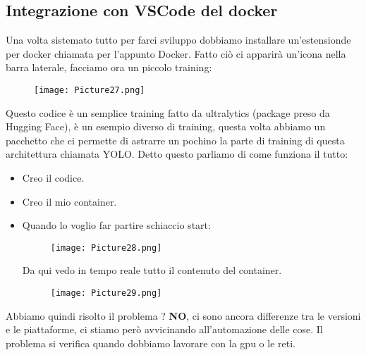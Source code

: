 \documentclass[a4paper,12pt]{article}
\begin{document}
\subsection{Integrazione con VSCode del docker}
Una volta sistemato tutto per farci sviluppo dobbiamo installare un'estensionde per docker chiamata per l'appunto Docker.
Fatto ciò ci apparirà un'icona nella barra laterale, facciamo ora un piccolo training:
\begin{figure}[H]
    \centering
    \texttt{[image: Picture27.png]}
\end{figure}
Questo codice è un semplice training fatto da ultralytics (package preso da Hugging Face), è un esempio diverso di training, questa volta abbiamo un pacchetto che ci permette di astrarre un pochino la parte di training di questa architettura chiamata YOLO.
Detto questo parliamo di come funziona il tutto:
\begin{itemize}
    \item Creo il codice.
    \item Creo il mio container.
    \item Quando lo voglio far partire schiaccio start:
    \begin{figure}[H]
        \centering
        \texttt{[image: Picture28.png]}
    \end{figure}
    Da qui vedo in tempo reale tutto il contenuto del container.
    \begin{figure}[H]
        \centering
        \texttt{[image: Picture29.png]}
    \end{figure}
\end{itemize}
Abbiamo quindi risolto il problema ? \textbf{NO}, ci sono ancora differenze tra le versioni e le piattaforme, ci stiamo però avvicinando all'automazione delle cose. Il problema si verifica quando dobbiamo lavorare con la gpu o le reti.
\end{document}
